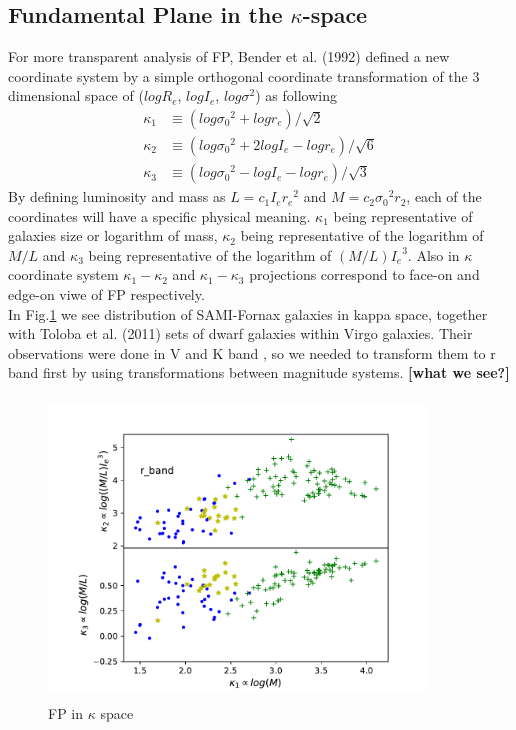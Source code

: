 \documentclass{aa}
\begin{document}
\subsection{Fundamental Plane in the $\kappa$-space}
For more transparent analysis of FP, Bender et al. (1992) defined a new coordinate system by a simple orthogonal coordinate transformation of the 3 dimensional space of ($logR_e$, $logI_e$, $log\sigma^2$) as following
\begin{align}
\kappa_1 &\equiv(log{\sigma_0}^2+log r_e)/\sqrt{2} \\
\kappa_2 &\equiv(log{\sigma_0}^2+2logI_e-log r_e)/\sqrt{6} \\
\kappa_3 &\equiv(log{\sigma_0}^2-log I_e-log r_e)/\sqrt{3}
\end{align}
By defining luminosity and mass as $L=c_1I_e{r_e}^2$ and $M=c_2{\sigma_0}^2r_2$, each of the coordinates will have a specific physical meaning. $\kappa_1$ being representative of galaxies size or logarithm of mass, $\kappa_2$ being representative of the logarithm of $M/L$ and $\kappa_3$ being representative of the logarithm of $(M/L){I_e}^3$. Also in $\kappa$ coordinate system $\kappa_1-\kappa_2$ and $\kappa_1-\kappa_3$ projections correspond to face-on and edge-on viwe of FP respectively.\\
In Fig.\ref{fig:FPkappa} we see distribution of SAMI-Fornax galaxies in kappa space, together with Toloba et al. (2011) sets of dwarf galaxies within Virgo galaxies. Their observations were done in V and K band , so we needed to transform them to r band first by using transformations between magnitude systems. \textbf{[what we see?]}
\begin{figure}[!htb]
   \centering
   \includegraphics[width=10cm,height=8cm,keepaspectratio]
   {../2_pipeline/2_FP_kappa+Liter/FP_kappa+Liter_DWARF.pdf}
         \caption{FP in $\kappa$ space}
         \label{fig:FPkappa}
\end{figure}
\end{document}
